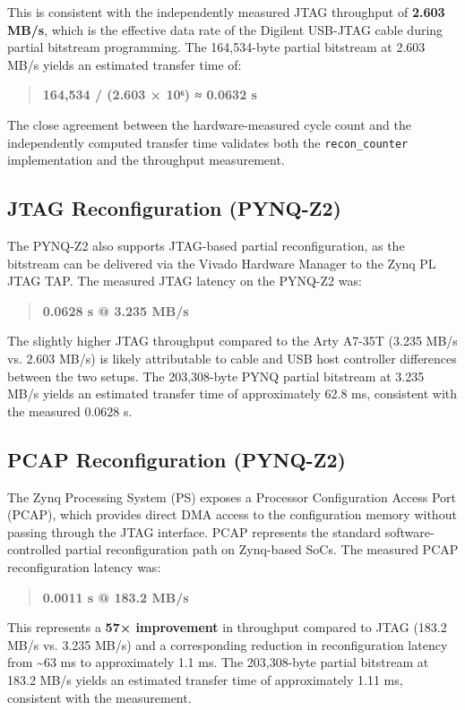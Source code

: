 This is consistent with the independently measured JTAG throughput of \textbf{2.603 MB/s}, which is the effective data rate of the Digilent USB-JTAG cable during partial bitstream programming. The 164,534-byte partial bitstream at 2.603 MB/s yields an estimated transfer time of:

\begin{quote}
\textbf{164,534 / (2.603 × 10⁶) ≈ 0.0632 s}
\end{quote}

The close agreement between the hardware-measured cycle count and the independently computed transfer time validates both the \texttt{recon\_counter} implementation and the throughput measurement.

\subsection{JTAG Reconfiguration (PYNQ-Z2)}

The PYNQ-Z2 also supports JTAG-based partial reconfiguration, as the bitstream can be delivered via the Vivado Hardware Manager to the Zynq PL JTAG TAP. The measured JTAG latency on the PYNQ-Z2 was:

\begin{quote}
\textbf{0.0628 s @ 3.235 MB/s}
\end{quote}

The slightly higher JTAG throughput compared to the Arty A7-35T (3.235 MB/s vs. 2.603 MB/s) is likely attributable to cable and USB host controller differences between the two setups. The 203,308-byte PYNQ partial bitstream at 3.235 MB/s yields an estimated transfer time of approximately 62.8 ms, consistent with the measured 0.0628 s.

\subsection{PCAP Reconfiguration (PYNQ-Z2)}

The Zynq Processing System (PS) exposes a Processor Configuration Access Port (PCAP), which provides direct DMA access to the configuration memory without passing through the JTAG interface. PCAP represents the standard software-controlled partial reconfiguration path on Zynq-based SoCs. The measured PCAP reconfiguration latency was:

\begin{quote}
\textbf{0.0011 s @ 183.2 MB/s}
\end{quote}

This represents a \textbf{57× improvement} in throughput compared to JTAG (183.2 MB/s vs. 3.235 MB/s) and a corresponding reduction in reconfiguration latency from \textasciitilde{}63 ms to approximately 1.1 ms. The 203,308-byte partial bitstream at 183.2 MB/s yields an estimated transfer time of approximately 1.11 ms, consistent with the measurement.

